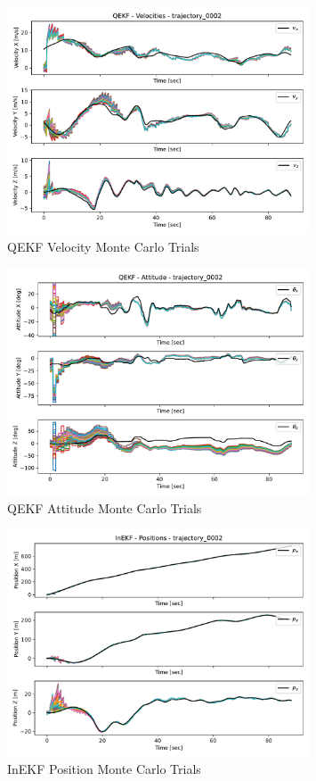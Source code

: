 \begin{figure}[H]
    \centering
    \includegraphics[width=0.8\textwidth]{figs/QEKF_trajectory_0002_velocities.pdf}
    \caption{QEKF Velocity Monte Carlo Trials}
    \label{fig: QEKF Velocity Monte Carlo Trials}
\end{figure}

\begin{figure}[H]
    \centering
    \includegraphics[width=0.8\textwidth]{figs/QEKF_trajectory_0002_attitudes.pdf}
    \caption{QEKF Attitude Monte Carlo Trials}
    \label{fig: QEKF Attitude Monte Carlo Trials}
\end{figure}

\begin{figure}[H]
    \centering
    \includegraphics[width=0.8\textwidth]{figs/InEKF_trajectory_0002_positions.pdf}
    \caption{InEKF Position Monte Carlo Trials}
    \label{fig: InEKF Position Monte Carlo Trials}
\end{figure}


